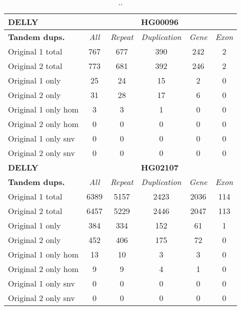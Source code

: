 \begin{table}[htb]
\begin{center}
\begin{tabular}{|l|c||c|c|c|c|}
\hline
{\bf DELLY} & \multicolumn{5}{|c|}{\bf HG00096} \\
\hline
\cline{2-6}
{\bf Tandem dups.} & {\it All} & {\it Repeat} & {\it Duplication} & {\it Gene} & {\it Exon} \\
\hline
Original 1 total & 767 & 677 & 390 & 242 & 2\\ 
\hline
Original 2 total & 773 & 681 & 392 & 246 & 2\\ 
\hline
Original 1 only & 25 & 24 & 15 & 2 & 0\\ 
\hline
Original 2 only & 31 & 28 & 17 & 6 & 0\\ 
\hline
Original 1 only hom & 3 & 3 & 1 & 0 & 0\\ 
\hline
Original 2 only hom & 0 & 0 & 0 & 0 & 0\\ 
\hline
Original 1 only snv & 0 & 0 & 0 & 0 & 0\\ 
\hline
Original 2 only snv & 0 & 0 & 0 & 0 & 0\\ 
\hline
\hline
{\bf DELLY} & \multicolumn{5}{|c|}{\bf HG02107} \\
\hline
\cline{2-6}
{\bf Tandem dups.} & {\it All} & {\it Repeat} & {\it Duplication} & {\it Gene} & {\it Exon} \\
\hline
Original 1 total & 6389 & 5157 & 2423 & 2036 & 114\\ 
\hline
Original 2 total & 6457 & 5229 & 2446 & 2047 & 113\\ 
\hline
Original 1 only & 384 & 334 & 152 & 61 & 1\\ 
\hline
Original 2 only & 452 & 406 & 175 & 72 & 0\\ 
\hline
Original 1 only hom & 13 & 10 & 3 & 3 & 0\\ 
\hline
Original 2 only hom & 9 & 9 & 4 & 1 & 0\\ 
\hline
Original 1 only snv & 0 & 0 & 0 & 0 & 0\\ 
\hline
Original 2 only snv & 0 & 0 & 0 & 0 & 0\\ 
\hline
\end{tabular}
\end{center}
\caption{ .. }
\label{tab:orig-vs-shuf-delly-dups}
\end{table}

